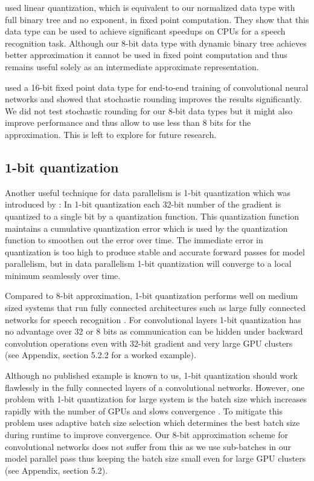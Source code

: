 \documentclass{article} %
\begin{document}
\citet{vanhoucke2011improving} used linear quantization, which is equivalent to our normalized data type with full binary tree and no exponent, in fixed point computation. They show that this data type can be used to achieve significant speedups on CPUs for a speech recognition task. Although our 8-bit data type with dynamic binary tree achieves better approximation it cannot be used in fixed point computation and thus remains useful solely as an intermediate approximate representation.


\citet{gupta2015deep} used a 16-bit fixed point data type for end-to-end training of convolutional neural networks and showed that stochastic rounding improves the results significantly. We did not test stochastic rounding for our 8-bit data types but it might also improve performance and thus allow to use less than 8 bits for the approximation. This is left to explore for future research.


\subsection{1-bit quantization}
Another useful technique for data parallelism is 1-bit quantization which was introduced by \citet{seide20141}: In 1-bit quantization each 32-bit number of the gradient is quantized to a single bit by a quantization function. This quantization function maintains a cumulative quantization error which is used by the quantization function to smoothen out the error over time. The immediate error in quantization is too high to produce stable and accurate forward passes for model parallelism, but in data parallelism 1-bit quantization will converge to a local minimum seamlessly over time.

Compared to 8-bit approximation, 1-bit quantization performs well on medium sized systems that run fully connected architectures such as large fully connected networks for speech recognition \citep{strom2015scalable, seide20141}. For convolutional layers 1-bit quantization has no advantage over 32 or 8 bits as communication can be hidden under backward convolution operations even with 32-bit gradient and very large GPU clusters (see Appendix, section 5.2.2 for a worked example). 

Although no published example is known to us, 1-bit quantization should work flawlessly in the fully connected layers of a convolutional networks. However, one problem with 1-bit quantization for large system is the batch size which increases rapidly with the number of GPUs and slows convergence \citep{seide20141,strom2015scalable, krizhevsky2014one}. To mitigate this problem \citet{seide20141} uses adaptive batch size selection which determines the best batch size during runtime to improve convergence. Our 8-bit approximation scheme for convolutional networks does not suffer from this as we use sub-batches in our model parallel pass thus keeping the batch size small even for large GPU clusters (see Appendix, section 5.2).
\end{document}

